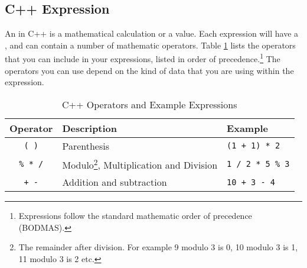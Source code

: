 \clearpage
\subsection{C++ Expression} %
\label{sub:program-creation-c_expression}

An  in C++ is a mathematical calculation or a  value. Each expression will have a , and can contain a number of mathematic operators. Table \ref{tbl:program-creation-c operators and expresions} lists the operators that you can include in your expressions, listed in order of precedence.\footnote{Expressions follow the standard mathematic order of precedence (BODMAS).} The operators you can use depend on the kind of data that you are using within the expression.

\begin{table}[h]
  \begin{minipage}{\textwidth}
  \centering
  \begin{tabular}{|c|l|l|}
    \hline
    \textbf{Operator} & \textbf{Description} & \textbf{Example} \\
    \hline
    \texttt{ ( ) }     &   Parenthesis                 & \texttt{(1 + 1) * 2}  \\
    \texttt{\% * /}      &   Modulo\footnote{The remainder after division. For example 9 modulo 3 is 0, 10 modulo 3 is 1, 11 modulo 3 is 2 etc.}, Multiplication and Division & \texttt{1 / 2 * 5 \% 3}    \\
    \texttt{+ -}      &   Addition and subtraction    & \texttt{10 + 3 - 4}   \\
    \hline
  \end{tabular}
  \end{minipage}
  \caption{C++ Operators and Example Expressions}
  \label{tbl:program-creation-c operators and expresions}
\end{table}


